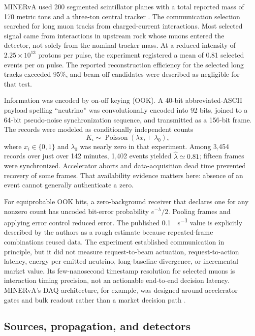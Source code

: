 \documentclass[11pt]{article}
\begin{document}
MINERvA used 200 segmented scintillator planes with a total reported mass of 170 metric tons and a three-ton central tracker \citep{Stancil2012,Aliaga2014}. The communication selection searched for long muon tracks from charged-current interactions. Most selected signal came from interactions in upstream rock whose muons entered the detector, not solely from the nominal tracker mass. At a reduced intensity of $2.25\times10^{13}$ protons per pulse, the experiment registered a mean of 0.81 selected events per on pulse. The reported reconstruction efficiency for the selected long tracks exceeded 95\%, and beam-off candidates were described as negligible for that test.

Information was encoded by on-off keying (OOK). A 40-bit abbreviated-ASCII payload spelling ``neutrino'' was convolutionally encoded into 92 bits, joined to a 64-bit pseudo-noise synchronization sequence, and transmitted as a 156-bit frame. The records were modeled as conditionally independent counts
\begin{equation}
K_i\sim\operatorname{Poisson}(\lambda x_i+\lambda_0),
\end{equation}
where $x_i\in\{0,1\}$ and $\lambda_0$ was nearly zero in that experiment. Among 3,454 records over just over 142 minutes, 1,402 events yielded $\widehat{\lambda}\simeq0.81$; fifteen frames were synchronized. Accelerator aborts and data-acquisition dead time prevented recovery of some frames. That availability evidence matters here: absence of an event cannot generally authenticate a zero.

For equiprobable OOK bits, a zero-background receiver that declares one for any nonzero count has uncoded bit-error probability $e^{-\lambda}/2$. Pooling frames and applying error control reduced error. The published \SI{0.1}{\bit\per\second} value is explicitly described by the authors as a rough estimate because repeated-frame combinations reused data. The experiment established communication in principle, but it did not measure request-to-beam actuation, request-to-action latency, energy per emitted neutrino, long-baseline divergence, or incremental market value. Its few-nanosecond timestamp resolution for selected muons is interaction timing precision, not an actionable end-to-end decision latency. MINERvA's DAQ architecture, for example, was designed around accelerator gates and bulk readout rather than a market decision path \citep{Perdue2012}.

\subsection{Sources, propagation, and detectors}
\end{document}
